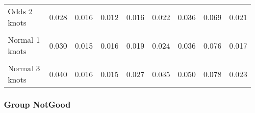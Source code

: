 \documentclass[
]{article}
\begin{document}
\begin{table}[H]
{\begin{tabular}[t]{lrrrrrrrr}
Odds 2 knots & 0.028 & 0.016 & 0.012 & 0.016 & 0.022 & 0.036 & 0.069 & 0.021\\
\cellcolor{gray!10}{Odds 3 knots} & \cellcolor{gray!10}{0.034} & \cellcolor{gray!10}{0.019} & \cellcolor{gray!10}{0.015} & \cellcolor{gray!10}{0.019} & \cellcolor{gray!10}{0.027} & \cellcolor{gray!10}{0.045} & \cellcolor{gray!10}{0.077} & \cellcolor{gray!10}{0.026}\\
Normal 1 knots & 0.030 & 0.015 & 0.016 & 0.019 & 0.024 & 0.036 & 0.076 & 0.017\\
\cellcolor{gray!10}{Normal 2 knots} & \cellcolor{gray!10}{0.030} & \cellcolor{gray!10}{0.015} & \cellcolor{gray!10}{0.016} & \cellcolor{gray!10}{0.019} & \cellcolor{gray!10}{0.025} & \cellcolor{gray!10}{0.036} & \cellcolor{gray!10}{0.076} & \cellcolor{gray!10}{0.017}\\
Normal 3 knots & 0.040 & 0.016 & 0.015 & 0.027 & 0.035 & 0.050 & 0.078 & 0.023\\
\bottomrule
\end{tabular}}
\end{table}

\clearpage

\subsubsection{Group NotGood}\label{group-notgood}
\end{document}
